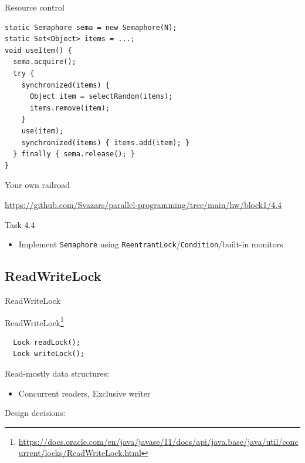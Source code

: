 \begin{frame}[fragile]{Resource control}

\begin{verbatim}
static Semaphore sema = new Semaphore(N);
static Set<Object> items = ...;
void useItem() {
  sema.acquire();
  try {
    synchronized(items) {
      Object item = selectRandom(items);
      items.remove(item);
    }
    use(item);
    synchronized(items) { items.add(item); }
  } finally { sema.release(); }
}
\end{verbatim}
\end{frame}

\begin{frame}[fragile]{Your own railroad}

{\small\url{https://github.com/Svazars/parallel-programming/tree/main/hw/block1/4.4}}
\begin{homeworkmail}{Task 4.4}
    \begin{itemize}
        \item Implement \texttt{Semaphore} using \texttt{ReentrantLock}/\texttt{Condition}/built-in monitors        
    \end{itemize}
\end{homeworkmail}
\end{frame}

\subsection{ReadWriteLock}
\showTOCSub

\begin{frame}[t,fragile]{ReadWriteLock}

ReadWriteLock\footnote{\tiny\url{https://docs.oracle.com/en/java/javase/11/docs/api/java.base/java/util/concurrent/locks/ReadWriteLock.html}}

\begin{verbatim}
  Lock readLock();
  Lock writeLock();
\end{verbatim}

Read-mostly data structures:
\begin{itemize}
    \item Concurrent readers, Exclusive writer
\end{itemize}

Design decisions:
\end{frame}


